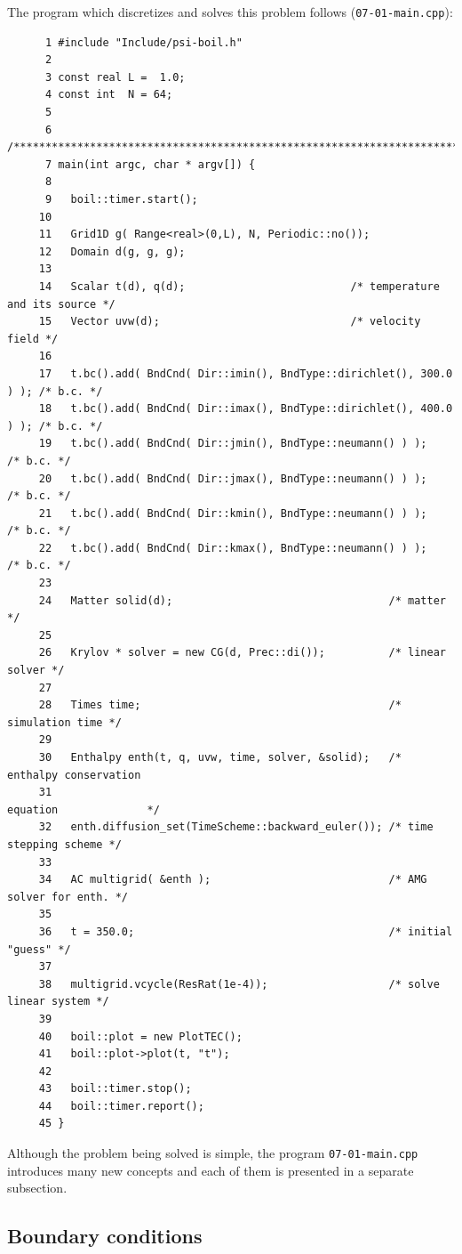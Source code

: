 The program which discretizes and solves this problem follows ({\tt 07-01-main.cpp}):
%
{\small \begin{verbatim}
      1 #include "Include/psi-boil.h"
      2
      3 const real L =  1.0;
      4 const int  N = 64;
      5
      6 /****************************************************************************/
      7 main(int argc, char * argv[]) {
      8
      9   boil::timer.start();
     10
     11   Grid1D g( Range<real>(0,L), N, Periodic::no());
     12   Domain d(g, g, g);
     13
     14   Scalar t(d), q(d);                          /* temperature and its source */
     15   Vector uvw(d);                              /* velocity field */
     16
     17   t.bc().add( BndCnd( Dir::imin(), BndType::dirichlet(), 300.0 ) ); /* b.c. */
     18   t.bc().add( BndCnd( Dir::imax(), BndType::dirichlet(), 400.0 ) ); /* b.c. */
     19   t.bc().add( BndCnd( Dir::jmin(), BndType::neumann() ) );          /* b.c. */
     20   t.bc().add( BndCnd( Dir::jmax(), BndType::neumann() ) );          /* b.c. */
     21   t.bc().add( BndCnd( Dir::kmin(), BndType::neumann() ) );          /* b.c. */
     22   t.bc().add( BndCnd( Dir::kmax(), BndType::neumann() ) );          /* b.c. */
     23
     24   Matter solid(d);                                  /* matter */
     25
     26   Krylov * solver = new CG(d, Prec::di());          /* linear solver */
     27
     28   Times time;                                       /* simulation time */
     29
     30   Enthalpy enth(t, q, uvw, time, solver, &solid);   /* enthalpy conservation
     31                                                        equation              */
     32   enth.diffusion_set(TimeScheme::backward_euler()); /* time stepping scheme */
     33
     34   AC multigrid( &enth );                            /* AMG solver for enth. */
     35
     36   t = 350.0;                                        /* initial "guess" */
     37
     38   multigrid.vcycle(ResRat(1e-4));                   /* solve linear system */
     39
     40   boil::plot = new PlotTEC();
     41   boil::plot->plot(t, "t");
     42
     43   boil::timer.stop();
     44   boil::timer.report();
     45 }
\end{verbatim}}
%
Although the problem being solved is simple, the program {\tt 07-01-main.cpp}
introduces many new concepts and each of them is presented in a separate subsection. 

\subsection{Boundary conditions}
\label{sub_sec_bc}

